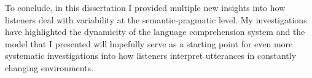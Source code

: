 \vspace{1em}

To conclude, in this dissertation I provided multiple new insights into how listeners deal with variability at the semantic-pragmatic level. My investigations have highlighted the dynamicity of the language comprehension system and the model that I presented will hopefully serve as a starting point for even more systematic investigations into how listeners interpret utterances in constantly changing environments. 



